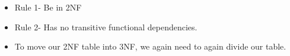 \setlength{\columnsep}{3pt}
\begin{flushleft}
	\begin{itemize}
		\item Rule 1- Be in 2NF
		\item Rule 2- Has no transitive functional dependencies.
		\item To move our 2NF table into 3NF, we again need to again divide our table.
		
		
	\end{itemize}
	
\end{flushleft}


\newpage
